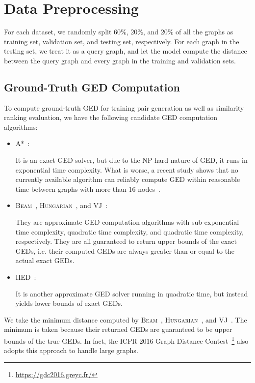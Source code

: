 \documentclass{article}
\newcommand{\hed}{\textsc{HED}\xspace}
\begin{document}
 \section{Data Preprocessing}
\label{sec-data-preproc}

For each dataset, we randomly split 60\%, 20\%, and 20\% of all the graphs as training set, validation set, and testing set, respectively. For each graph in the testing set, we treat it as a query graph, and let the model compute the distance between the query graph and every graph in the training and validation sets. 

\subsection{Ground-Truth GED Computation}
\label{subsec-ged-algo}

To compute ground-truth GED for training pair generation as well as similarity ranking evaluation, we have the following candidate GED computation algorithms:
\begin{itemize}
    \item \textsc{A*}~\cite{hart1968formal}:
    
    It is an exact GED solver, but due to the NP-hard nature of GED, it runs in exponential time complexity. What is worse, a recent study shows that no currently available algorithm can reliably compute GED within reasonable time between graphs with more than 16 nodes~\cite{blumenthal2018exact}.
    
    \item \textsc{Beam}~\cite{neuhaus2006fast}, \textsc{Hungarian}~\cite{riesen2009approximate}, and \textsc{VJ}~\cite{fankhauser2011speeding}:
    
    They are approximate GED computation algorithms with sub-exponential time complexity, quadratic time complexity, and quadratic time complexity, respectively. They are all guaranteed to return upper bounds of the exact GEDs, i.e. their computed GEDs are always greater than or equal to the actual exact GEDs.
    
    \item \hed~\cite{fischer2015approximation}:
    
    It is another approximate GED solver running in quadratic time, but instead yields lower bounds of exact GEDs.
\end{itemize}

We take the minimum distance computed by \textsc{Beam}~\cite{neuhaus2006fast}, \textsc{Hungarian}~\cite{riesen2009approximate}, and \textsc{VJ}~\cite{fankhauser2011speeding}. The minimum is taken because their returned GEDs are guaranteed to be upper bounds of the true GEDs. In fact, the ICPR 2016 Graph Distance Contest~\footnote{\url{https://gdc2016.greyc.fr/}} also adopts this approach to handle large graphs.
\end{document}
